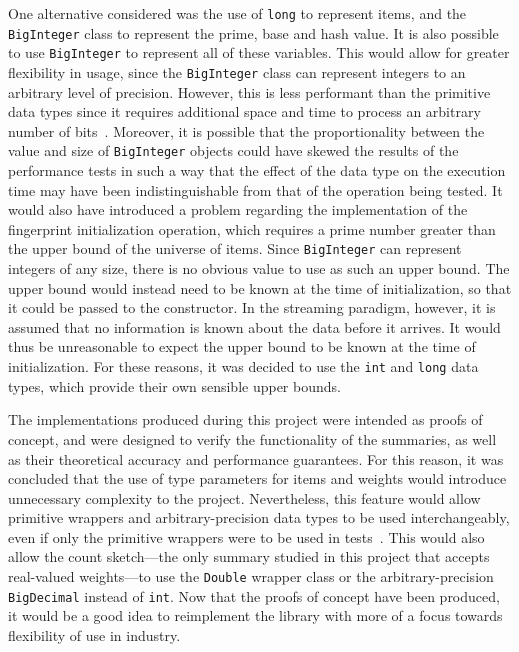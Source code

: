 One alternative considered was the use of \lstinline{long} to represent items, and the \lstinline{BigInteger} class to represent the prime, base and hash value.
It is also possible to use \lstinline{BigInteger} to represent all of these variables.
This would allow for greater flexibility in usage, since the \lstinline{BigInteger} class can represent integers to an arbitrary level of precision.
However, this is less performant than the primitive data types since it requires additional space and time to process an arbitrary number of bits~\citep{o14}.
Moreover, it is possible that the proportionality between the value and size of \lstinline{BigInteger} objects could have skewed the results of the performance tests in such a way that the effect of the data type on the execution time may have been indistinguishable from that of the operation being tested.
It would also have introduced a problem regarding the implementation of the fingerprint initialization operation, which requires a prime number greater than the upper bound of the universe of items.
Since \lstinline{BigInteger} can represent integers of any size, there is no obvious value to use as such an upper bound.
The upper bound would instead need to be known at the time of initialization, so that it could be passed to the constructor.
In the streaming paradigm, however, it is assumed that no information is known about the data before it arrives.
It would thus be unreasonable to expect the upper bound to be known at the time of initialization.
For these reasons, it was decided to use the \lstinline{int} and \lstinline{long} data types, which provide their own sensible upper bounds.

The implementations produced during this project were intended as proofs of concept, and were designed to verify the functionality of the summaries, as well as their theoretical accuracy and performance guarantees.
For this reason, it was concluded that the use of type parameters for items and weights would introduce unnecessary complexity to the project.
Nevertheless, this feature would allow primitive wrappers and arbitrary-precision data types to be used interchangeably, even if only the primitive wrappers were to be used in tests~\citep{kiezun07}.
This would also allow the count sketch---the only summary studied in this project that accepts real-valued weights---to use the \lstinline{Double} wrapper class or the arbitrary-precision \lstinline{BigDecimal} instead of \lstinline{int}.
Now that the proofs of concept have been produced, it would be a good idea to reimplement the library with more of a focus towards flexibility of use in industry.


